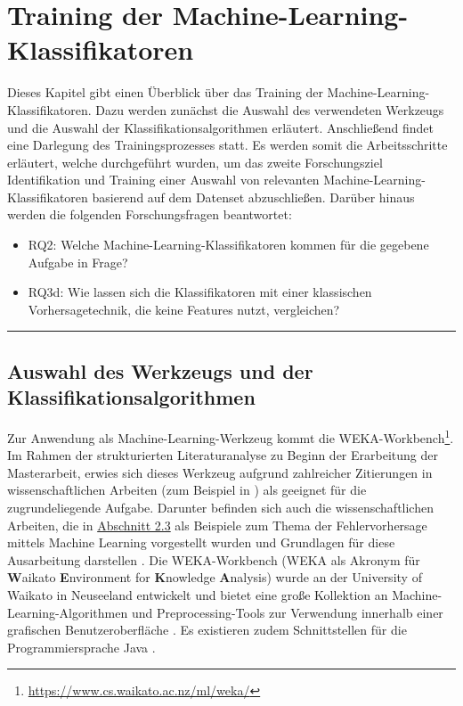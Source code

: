 
\chapter{Training der Machine-Learning-Klassifikatoren}
\label{training}

Dieses Kapitel gibt einen Überblick über das Training der Machine-Learning-Klassifikatoren. Dazu werden zunächst die Auswahl des verwendeten Werkzeugs und die Auswahl der Klassifikationsalgorithmen erläutert. Anschließend findet eine Darlegung des Trainingsprozesses statt. Es werden somit die Arbeitsschritte erläutert, welche durchgeführt wurden, um das zweite Forschungsziel \glqq Identifikation und Training einer Auswahl von relevanten Machine-Learning-Klassifikatoren basierend auf dem Datenset\grqq{} abzuschließen. Darüber hinaus werden die folgenden Forschungsfragen beantwortet:
\vspace{-\topsep}
\begin{itemize}
\setlength{\itemsep}{-2pt}
\item RQ2: Welche Machine-Learning-Klassifikatoren kommen für die gegebene Aufgabe in
Frage?
\item RQ3d: Wie lassen sich die Klassifikatoren mit einer klassischen Vorhersagetechnik, die keine Features nutzt, vergleichen?
\end{itemize}
\smallskip
\hrule

\section{Auswahl des Werkzeugs und der Klassifikationsalgorithmen}

Zur Anwendung als Machine-Learning-Werkzeug kommt die WEKA-Workbench\footnote{\href{https://www.cs.waikato.ac.nz/ml/weka/}{https://www.cs.waikato.ac.nz/ml/weka/}}. Im Rahmen der strukturierten Literaturanalyse zu Beginn der Erarbeitung der Masterarbeit, erwies sich dieses Werkzeug aufgrund zahlreicher Zitierungen in wissenschaftlichen Arbeiten (zum Beispiel in \cite{Hammouri2018,Ratzinger2008}) als geeignet für die zugrundeliegende Aufgabe. Darunter befinden sich auch die wissenschaftlichen Arbeiten, die in \hyperref[]{Abschnitt 2.3} als Beispiele zum Thema der Fehlervorhersage mittels Machine Learning vorgestellt wurden und Grundlagen für diese Ausarbeitung darstellen \cite{Moser2008,Queiroz2016}. Die WEKA-Workbench (WEKA als Akronym für \textbf{W}aikato \textbf{E}nvironment for \textbf{K}nowledge \textbf{A}nalysis) wurde an der University of Waikato in Neuseeland entwickelt und bietet eine große Kollektion an Machine-Learning-Algorithmen und Preprocessing-Tools zur Verwendung innerhalb einer grafischen Benutzeroberfläche \cite{Weka2016}. Es existieren zudem Schnittstellen für die Programmiersprache Java \cite{Weka2016}.

